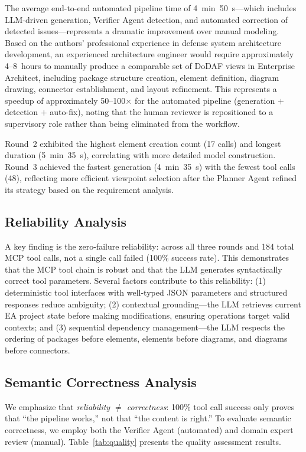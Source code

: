 \documentclass{ieeeaccess}
\begin{document}
The average end-to-end automated pipeline time of 4~min~50~s---which includes LLM-driven generation, Verifier Agent detection, and automated correction of detected issues---represents a dramatic improvement over manual modeling. Based on the authors' professional experience in defense system architecture development, an experienced architecture engineer would require approximately 4--8~hours to manually produce a comparable set of DoDAF views in Enterprise Architect, including package structure creation, element definition, diagram drawing, connector establishment, and layout refinement. This represents a speedup of approximately 50--100$\times$ for the automated pipeline (generation $+$ detection $+$ auto-fix), noting that the human reviewer is repositioned to a supervisory role rather than being eliminated from the workflow.

Round~2 exhibited the highest element creation count (17 calls) and longest duration (5~min~35~s), correlating with more detailed model construction. Round~3 achieved the fastest generation (4~min~35~s) with the fewest tool calls (48), reflecting more efficient viewpoint selection after the Planner Agent refined its strategy based on the requirement analysis.

\subsection{Reliability Analysis}

A key finding is the zero-failure reliability: across all three rounds and 184 total MCP tool calls, not a single call failed (100\% success rate). This demonstrates that the MCP tool chain is robust and that the LLM generates syntactically correct tool parameters. Several factors contribute to this reliability: (1) deterministic tool interfaces with well-typed JSON parameters and structured responses reduce ambiguity; (2) contextual grounding---the LLM retrieves current EA project state before making modifications, ensuring operations target valid contexts; and (3) sequential dependency management---the LLM respects the ordering of packages before elements, elements before diagrams, and diagrams before connectors.

\subsection{Semantic Correctness Analysis}

We emphasize that \emph{reliability $\neq$ correctness}: 100\% tool call success only proves that ``the pipeline works,'' not that ``the content is right.'' To evaluate semantic correctness, we employ both the Verifier Agent (automated) and domain expert review (manual). Table~\ref{tab:quality} presents the quality assessment results.
\end{document}
